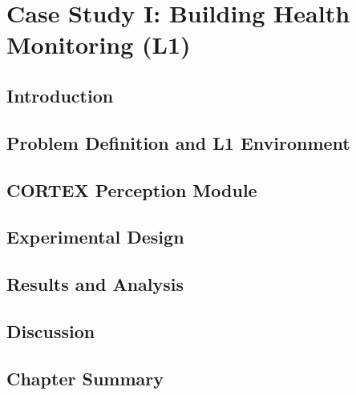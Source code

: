 
\chapter{Case Study I: Building Health Monitoring (L1)} \label{chp:building}

\section{Introduction}

\section{Problem Definition and L1 Environment}

\section{CORTEX Perception Module}

\section{Experimental Design}

\section{Results and Analysis}

\section{Discussion}

\section{Chapter Summary}
